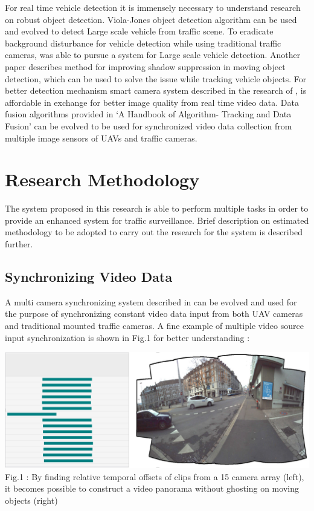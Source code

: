 \documentclass[12pt,a4paper,oneside]{article}
\begin{document}
For real time vehicle detection it is immensely necessary to understand \cite{viola2001robust} research on robust object detection. Viola-Jones object detection algorithm can be used and evolved to detect Large scale vehicle from traffic scene. To eradicate background disturbance for vehicle detection while using traditional traffic cameras, \cite{feris2012large} was able to pursue a system for Large scale vehicle detection. Another paper \cite{cucchiara2001improving} describes method for improving shadow suppression in moving object detection, which can be used to solve the issue while tracking vehicle objects. For better detection mechanism smart camera system described in the research of \cite{bramberger2003smart}, is affordable in exchange for better image quality from real time video data. Data fusion algorithms provided in ‘A Handbook of Algorithm- Tracking and Data Fusion’ \cite{bar2011tracking} can be evolved to be used for synchronized video data collection from multiple image sensors of UAVs and traffic cameras. 

\newpage
\section{Research Methodology}
The system proposed in this research is able to perform multiple tasks in order to provide an enhanced system for traffic surveillance. Brief description on estimated methodology to be adopted to carry out the research for the system is described further. 

\subsection{Synchronizing Video Data}

A multi camera synchronizing system described in \cite{wang2014videosnapping} can be evolved and used for the purpose of synchronizing constant video data input from both UAV cameras and traditional mounted traffic cameras. A fine example of multiple video source input synchronization is shown in Fig.1 for better understanding :

\begin{center}
\includegraphics[width=0.8\linewidth]{Fig1.PNG}\\
Fig.1 : By finding relative temporal offsets of clips from a 15 camera array (left), it becomes possible to construct a video panorama without ghosting on moving objects (right)
\end{center}
\end{document}
